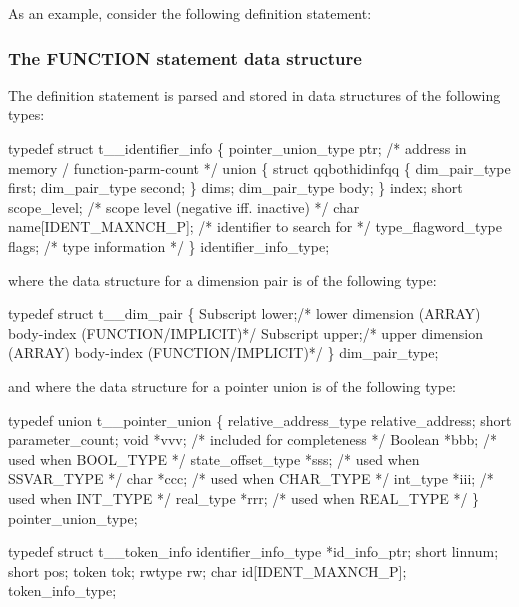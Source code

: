 As an example, consider the following  definition statement:

\subsubsection{The FUNCTION statement data structure}
\label{sec:func}

The  definition
statement is parsed and stored in data structures
of the following types:
\begin{codeexample}
typedef struct t__identifier_info
  \{
     pointer_union_type ptr;    /* address in memory / function-parm-count */
     union
        \{
           struct qqbothidinfqq
              \{
                 dim_pair_type first;
                 dim_pair_type second;
              \} dims;
           dim_pair_type body;
        \} index;
     short scope_level;         /* scope level (negative iff. inactive) */
     char name[IDENT_MAXNCH_P]; /* identifier to search for */
     type_flagword_type flags;  /* type information */
  \} identifier_info_type;
\end{codeexample}
where the data structure for a dimension pair is of the following type:
\begin{codeexample}
typedef struct t__dim_pair
  \{
    Subscript lower;/* lower dimension (ARRAY) body-index (FUNCTION/IMPLICIT)*/
    Subscript upper;/* upper dimension (ARRAY) body-index (FUNCTION/IMPLICIT)*/
  \} dim_pair_type;
\end{codeexample}

and where the data structure for a pointer union is of the following type:
\begin{codeexample}
typedef union t__pointer_union
   \{
     relative_address_type relative_address;
     short parameter_count;
     void *vvv;               /* included for completeness */
     Boolean *bbb;            /* used when BOOL_TYPE */
     state_offset_type *sss;  /* used when SSVAR_TYPE */
     char *ccc;               /* used when CHAR_TYPE */
     int_type *iii;           /* used when INT_TYPE */
     real_type *rrr;          /* used when REAL_TYPE */
   \} pointer_union_type;
\end{codeexample}


\begin{codeexample}
typedef struct t__token_info
   {
      identifier_info_type *id_info_ptr;
      short linnum;
      short pos;
      token tok;
      rwtype rw;
      char id[IDENT_MAXNCH_P];
   } token_info_type;
\end{codeexample}

